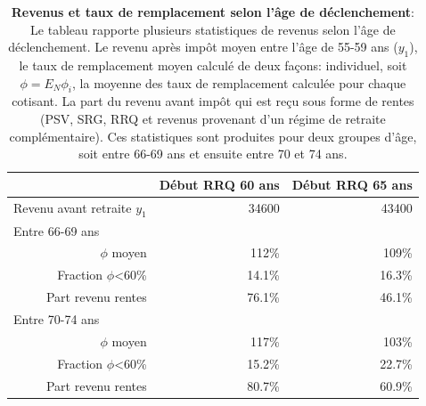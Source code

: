 \documentclass[french, 12pt]{article}
\begin{document}
	\begin{table}[!htbp]
		\centering
		\begin{tabular}{lrr}
			\toprule
			
											& Début RRQ 60 ans & Début RRQ 65 ans \\
			\midrule
			Revenu avant retraite $y_1$ & 34600 & 43400 \\
			\midrule 
			Entre 66-69 ans  & & \\
			\multicolumn{1}{r}{$\phi$ moyen} & 112\% & 109\% \\
			\multicolumn{1}{r}{Fraction $\phi$<60\%} & 14.1\% & 16.3\% \\
			\multicolumn{1}{r}{Part revenu rentes} & 76.1\% & 46.1\% \\
			\midrule
			Entre 70-74 ans  & & \\
			\multicolumn{1}{r}{$\phi$ moyen} & 117\% & 103\% \\
			\multicolumn{1}{r}{Fraction $\phi$<60\%} & 15.2\% & 22.7\% \\	
			\multicolumn{1}{r}{Part revenu rentes} & 80.7\% & 60.9\% \\
			\bottomrule 
			
		\end{tabular}
		
		\caption{\textbf{Revenus et taux de remplacement selon l'âge de déclenchement}: Le tableau rapporte plusieurs statistiques de revenus selon l'âge de déclenchement. Le revenu après impôt moyen entre l'âge de 55-59 ans ($y_1$), le taux de remplacement moyen calculé de deux façons: individuel, soit $\phi = E_N \phi_i$, la moyenne des taux de remplacement calculée pour chaque cotisant. La part du revenu avant impôt qui est reçu sous forme de rentes (PSV, SRG, RRQ et revenus provenant d'un régime de retraite complémentaire). Ces statistiques sont produites pour deux groupes d'âge, soit entre 66-69 ans et ensuite entre 70 et 74 ans. }
	\end{table}
	
\end{document}
